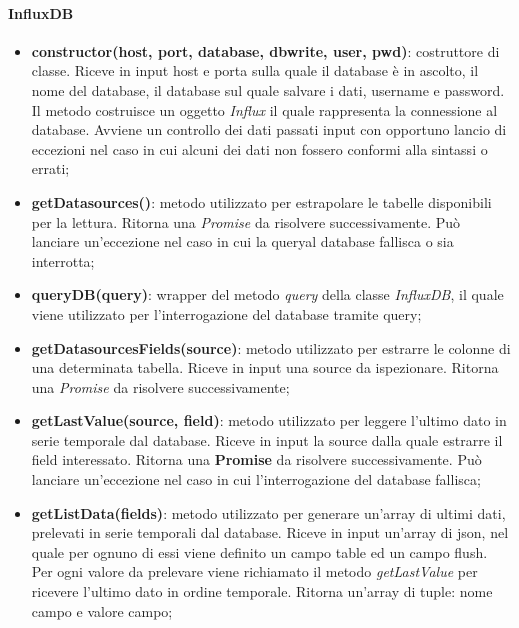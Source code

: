\paragraph{InfluxDB}

\begin{itemize}

	\item \textbf{constructor(host, port, database, dbwrite, user, pwd)}: costruttore di classe. Riceve in 
	input host e porta sulla quale il database è in ascolto, il nome del database, il database sul quale salvare i 
	dati, username e password. Il metodo costruisce un oggetto \textit{Influx} il quale rappresenta la 
	connessione al database. Avviene un controllo dei dati passati input con opportuno lancio di eccezioni 
	nel caso in cui alcuni dei dati non fossero conformi alla sintassi o errati; 
	
	\item \textbf{getDatasources()}: metodo utilizzato per estrapolare le tabelle disponibili per la lettura.
	Ritorna una \textit{Promise} da risolvere successivamente. Può lanciare un'eccezione nel caso in cui 
	la query\glossario al database fallisca o sia interrotta; 
	
	\item \textbf{queryDB(query)}: wrapper del metodo \textit{query} della classe \textit{InfluxDB}, il quale
	viene utilizzato per l'interrogazione del database tramite query; 
	
	\item \textbf{getDatasourcesFields(source)}: metodo utilizzato per estrarre le colonne di una determinata 
	tabella. Riceve in input una source da ispezionare. Ritorna una \textit{Promise} da risolvere
	successivamente; 
	
	\item \textbf{getLastValue(source, field)}: metodo utilizzato per leggere l'ultimo dato in serie temporale 
	dal database. Riceve in input la source dalla quale estrarre il field interessato. Ritorna una \textbf{Promise}
	da risolvere successivamente. Può lanciare un'eccezione nel caso in cui l'interrogazione del database 
	fallisca; 
	
	\item \textbf{getListData(fields)}: metodo utilizzato per generare un'array di ultimi dati, prelevati 
	in serie temporali dal database. Riceve in input un'array di json, nel quale per ognuno di essi viene 
	definito un campo table ed un campo flush. Per ogni valore da prelevare viene richiamato il metodo 
	\textit{getLastValue} per ricevere l'ultimo dato in ordine temporale. 
	Ritorna un'array di tuple: nome campo  e valore campo; 
	

\end{itemize}
